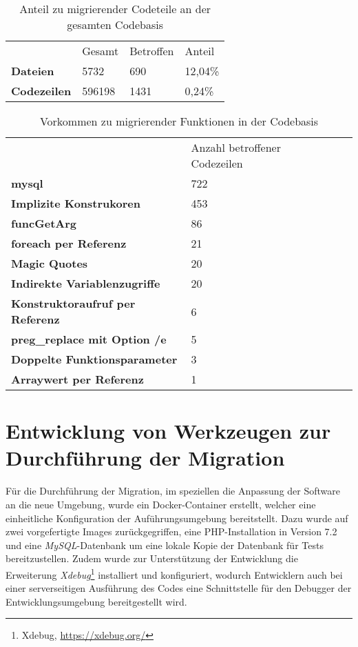 \begin{table}
    \centering
    \caption{Anteil zu migrierender Codeteile an der gesamten Codebasis}
    \label{tab:migrationPercentage}
    \begin{tabular}{llll}
                        & Gesamt & Betroffen & Anteil   \\
    \textbf{Dateien}    & 5732   & 690       & 12,04\%  \\
    \textbf{Codezeilen} & 596198 & 1431      & 0,24\%  
    \end{tabular}
\end{table}

\begin{table}
    \centering
    \caption{Vorkommen zu migrierender Funktionen in der Codebasis}
    \label{tab:migrationFunctions}
    \begin{tabular}{llll}
                                            & Anzahl betroffener Codezeilen \\
    \textbf{mysql}                          & 722 \\
    \textbf{Implizite Konstrukoren}         & 453 \\
    \textbf{funcGetArg}                     & 86 \\
    \textbf{foreach per Referenz}           & 21 \\
    \textbf{Magic Quotes}                   & 20 \\
    \textbf{Indirekte Variablenzugriffe}    & 20 \\
    \textbf{Konstruktoraufruf per Referenz} & 6 \\
    \textbf{preg\_replace mit Option /e}    & 5 \\
    \textbf{Doppelte Funktionsparameter}    & 3 \\
    \textbf{Arraywert per Referenz}         & 1 \\
    \end{tabular}
\end{table}

\section{Entwicklung von Werkzeugen zur Durchführung der Migration}
Für die Durchführung der Migration, im speziellen die Anpassung der Software an die neue Umgebung, wurde ein Docker-Container 
erstellt, welcher eine einheitliche Konfiguration der Auführungsumgebung bereitstellt. Dazu wurde auf zwei vorgefertigte 
Images zurückgegriffen, eine \ac{PHP}-Installation in Version 7.2 und eine \textit{MySQL}-Datenbank um eine lokale Kopie 
der Datenbank für Tests bereitzustellen. Zudem wurde zur Unterstützung der Entwicklung die Erweiterung \textit{Xdebug}\footnote{Xdebug, \url{https://xdebug.org/}} 
installiert und konfiguriert, wodurch Entwicklern auch bei einer serverseitigen Ausführung des Codes eine Schnittstelle 
für den Debugger der Entwicklungsumgebung bereitgestellt wird.

